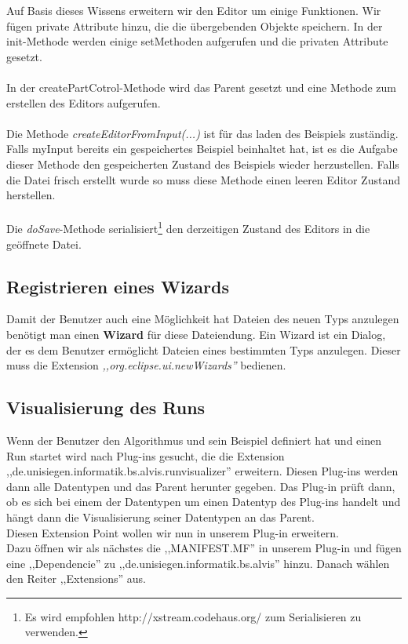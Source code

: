 \documentclass[10pt,a4paper]{article}
\begin{document}
Auf Basis dieses Wissens erweitern wir den Editor um einige Funktionen.
Wir fügen private Attribute hinzu, die die übergebenden Objekte speichern.
In der init-Methode werden einige setMethoden aufgerufen und die privaten Attribute gesetzt.
\\ \\
In der createPartCotrol-Methode wird das Parent gesetzt und eine Methode zum erstellen des Editors aufgerufen.
\\ \\
Die Methode \emph{createEditorFromInput(...)} ist für das laden des Beispiels zuständig. Falls myInput bereits ein gespeichertes Beispiel beinhaltet hat, ist es die Aufgabe dieser Methode den gespeicherten Zustand des Beispiels wieder herzustellen. Falls die Datei frisch erstellt wurde so muss diese Methode einen leeren Editor Zustand herstellen.
\\ \\
Die \emph{doSave}-Methode serialisiert\footnote{Es wird empfohlen http://xstream.codehaus.org/ zum Serialisieren zu verwenden. } den derzeitigen Zustand des Editors in die geöffnete Datei.



\subsection{Registrieren eines Wizards}
Damit der Benutzer auch eine Möglichkeit hat Dateien des neuen Typs anzulegen benötigt man einen \textbf{Wizard} für diese Dateiendung. Ein Wizard ist ein Dialog, der es dem Benutzer ermöglicht Dateien eines bestimmten Typs anzulegen. Dieser muss die Extension \emph{,,org.eclipse.ui.newWizards''} bedienen.

\subsection{Visualisierung des Runs}
Wenn der Benutzer den Algorithmus und sein Beispiel definiert hat und einen Run startet wird nach Plug-ins gesucht, die die Extension ,,de.unisiegen.informatik.bs.alvis.runvisualizer'' erweitern. Diesen Plug-ins werden dann alle Datentypen und das Parent herunter gegeben. Das Plug-in prüft dann, ob es sich bei einem der Datentypen um einen Datentyp des Plug-ins handelt und hängt dann die Visualisierung seiner Datentypen an das Parent.
\\
Diesen Extension Point wollen wir nun in unserem Plug-in erweitern.
\\
Dazu öffnen wir als nächstes die ,,MANIFEST.MF'' in unserem Plug-in und fügen eine ,,Dependencie'' zu ,,de.unisiegen.informatik.bs.alvis'' hinzu. Danach wählen den Reiter ,,Extensions'' aus. 
\end{document}
